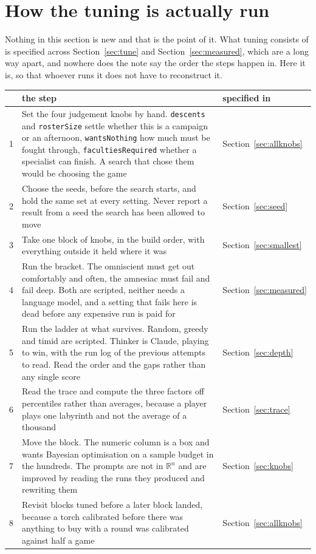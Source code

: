 \documentclass[11pt,a4paper]{article}
\begin{document}
\section{How the tuning is actually run}
\label{sec:procedure}

Nothing in this section is new and that is the point of it. What tuning consists of is specified
across Section~\ref{sec:tune} and Section~\ref{sec:measured}, which are a long way apart, and
nowhere does the note say the order the steps happen in. Here it is, so that whoever runs it does
not have to reconstruct it.

\begin{center}
\begin{tabular}{@{}r@{\hspace{3mm}}>{\raggedright\arraybackslash}p{}@{\hspace{3mm}}>{\raggedright\arraybackslash}p{}@{}}
\toprule
& \textbf{the step} & \textbf{specified in} \\
\midrule
1 & Set the four judgement knobs by hand. \texttt{descents} and \texttt{rosterSize} settle whether
this is a campaign or an afternoon, \texttt{wantsNothing} how much must be fought through,
\texttt{facultiesRequired} whether a specialist can finish. A search that chose them would be
choosing the game & Section~\ref{sec:allknobs} \\[1mm]
2 & Choose the seeds, before the search starts, and hold the same set at every setting. Never
report a result from a seed the search has been allowed to move & Section~\ref{sec:seed} \\[1mm]
3 & Take one block of knobs, in the build order, with everything outside it held where it was &
Section~\ref{sec:smallest} \\[1mm]
4 & Run the bracket. The omniscient must get out comfortably and often, the amnesiac must fail and
fail deep. Both are scripted, neither needs a language model, and a setting that fails here is dead
before any expensive run is paid for & Section~\ref{sec:measured} \\[1mm]
5 & Run the ladder at what survives. Random, greedy and timid are scripted. Thinker is Claude,
playing to win, with the run log of the previous attempts to read. Read the order and the gaps
rather than any single score & Section~\ref{sec:depth} \\[1mm]
6 & Read the trace and compute the three factors off percentiles rather than averages, because a
player plays one labyrinth and not the average of a thousand & Section~\ref{sec:trace} \\[1mm]
7 & Move the block. The numeric column is a box and wants Bayesian optimisation on a sample budget
in the hundreds. The prompts are not in $\mathbb{R}^n$ and are improved by reading the runs they
produced and rewriting them & Section~\ref{sec:knobs} \\[1mm]
8 & Revisit blocks tuned before a later block landed, because a torch calibrated before there was
anything to buy with a round was calibrated against half a game & Section~\ref{sec:allknobs} \\
\bottomrule
\end{tabular}
\end{center}
\end{document}
